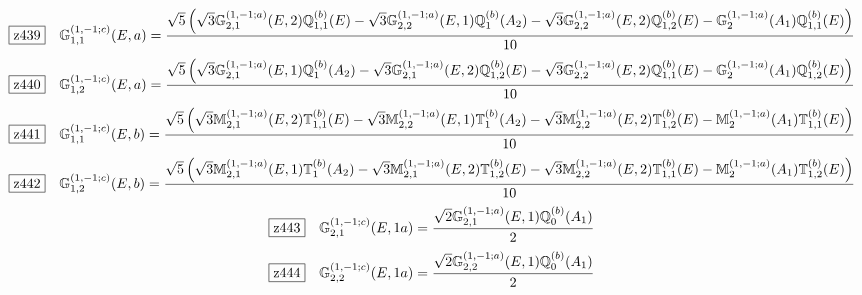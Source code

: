 \documentclass[fleqn,10pt,landscape]{jsarticle}
\begin{document}
\begin{dmath*}
\hspace*{3mm}\fbox{z439}\quad \mathbb{G}_{1,1}^{(1,-1;c)}(E,a)=\frac{\sqrt{5} \left(\sqrt{3} \mathbb{G}_{2,1}^{(1,-1;a)}(E,2) \mathbb{Q}_{1,1}^{(b)}(E) - \sqrt{3} \mathbb{G}_{2,2}^{(1,-1;a)}(E,1) \mathbb{Q}_{1}^{(b)}(A_{2}) - \sqrt{3} \mathbb{G}_{2,2}^{(1,-1;a)}(E,2) \mathbb{Q}_{1,2}^{(b)}(E) - \mathbb{G}_{2}^{(1,-1;a)}(A_{1}) \mathbb{Q}_{1,1}^{(b)}(E)\right)}{10}
\end{dmath*}
\begin{dmath*}
\hspace*{3mm}\fbox{z440}\quad \mathbb{G}_{1,2}^{(1,-1;c)}(E,a)=\frac{\sqrt{5} \left(\sqrt{3} \mathbb{G}_{2,1}^{(1,-1;a)}(E,1) \mathbb{Q}_{1}^{(b)}(A_{2}) - \sqrt{3} \mathbb{G}_{2,1}^{(1,-1;a)}(E,2) \mathbb{Q}_{1,2}^{(b)}(E) - \sqrt{3} \mathbb{G}_{2,2}^{(1,-1;a)}(E,2) \mathbb{Q}_{1,1}^{(b)}(E) - \mathbb{G}_{2}^{(1,-1;a)}(A_{1}) \mathbb{Q}_{1,2}^{(b)}(E)\right)}{10}
\end{dmath*}
\begin{dmath*}
\hspace*{3mm}\fbox{z441}\quad \mathbb{G}_{1,1}^{(1,-1;c)}(E,b)=\frac{\sqrt{5} \left(\sqrt{3} \mathbb{M}_{2,1}^{(1,-1;a)}(E,2) \mathbb{T}_{1,1}^{(b)}(E) - \sqrt{3} \mathbb{M}_{2,2}^{(1,-1;a)}(E,1) \mathbb{T}_{1}^{(b)}(A_{2}) - \sqrt{3} \mathbb{M}_{2,2}^{(1,-1;a)}(E,2) \mathbb{T}_{1,2}^{(b)}(E) - \mathbb{M}_{2}^{(1,-1;a)}(A_{1}) \mathbb{T}_{1,1}^{(b)}(E)\right)}{10}
\end{dmath*}
\begin{dmath*}
\hspace*{3mm}\fbox{z442}\quad \mathbb{G}_{1,2}^{(1,-1;c)}(E,b)=\frac{\sqrt{5} \left(\sqrt{3} \mathbb{M}_{2,1}^{(1,-1;a)}(E,1) \mathbb{T}_{1}^{(b)}(A_{2}) - \sqrt{3} \mathbb{M}_{2,1}^{(1,-1;a)}(E,2) \mathbb{T}_{1,2}^{(b)}(E) - \sqrt{3} \mathbb{M}_{2,2}^{(1,-1;a)}(E,2) \mathbb{T}_{1,1}^{(b)}(E) - \mathbb{M}_{2}^{(1,-1;a)}(A_{1}) \mathbb{T}_{1,2}^{(b)}(E)\right)}{10}
\end{dmath*}
\begin{dmath*}
\hspace*{3mm}\fbox{z443}\quad \mathbb{G}_{2,1}^{(1,-1;c)}(E,1a)=\frac{\sqrt{2} \mathbb{G}_{2,1}^{(1,-1;a)}(E,1) \mathbb{Q}_{0}^{(b)}(A_{1})}{2}
\end{dmath*}
\begin{dmath*}
\hspace*{3mm}\fbox{z444}\quad \mathbb{G}_{2,2}^{(1,-1;c)}(E,1a)=\frac{\sqrt{2} \mathbb{G}_{2,2}^{(1,-1;a)}(E,1) \mathbb{Q}_{0}^{(b)}(A_{1})}{2}
\end{dmath*}
\end{document}
